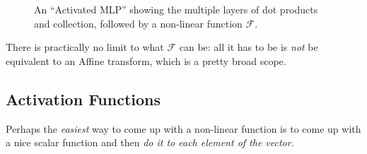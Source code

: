 \documentclass[a4paper,openany,11pt]{book}
\renewcommand\vec[1]{\boldsymbol{\mathbf{#1}}}
\begin{document}
\begin{figure*}
\begin{center}
					
					\end{center}\caption{An ``Activated MLP'' showing the multiple layers of dot products and collection, followed by a non-linear function $\mathcal{F}$.} \label{F:Activated}
				\end{figure*}
				There is practically no limit to what $\mathcal{F}$ can be: all it has to be is \textit{not} be equivalent to an Affine transform, which is a pretty broad scope. 

				\subsection{Activation Functions}

					Perhaps the \textit{easiest} way to come up with a non-linear function is to come up with a nice scalar function and then \textit{do it to each element of the vector}. 
\end{document}
